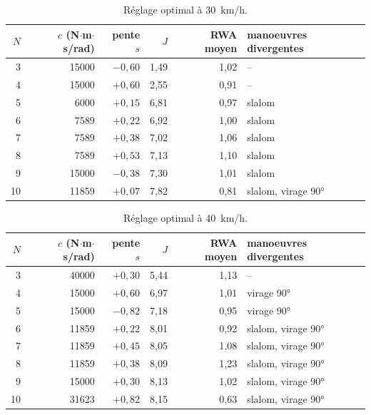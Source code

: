 \begin{table}[ht]\centering\small
\begin{tabular}{@{}r r r r r l@{}}\toprule
$N$ & $c$ (N$\cdot$m$\cdot$s/rad) & pente $s$ & $J$ & RWA moyen & manoeuvres divergentes\\\midrule
3 & 15000 & $-0{,}60$ & 1{,}49 & 1{,}02 & --\\
4 & 15000 & $+0{,}60$ & 2{,}55 & 0{,}91 & --\\
5 & 6000 & $+0{,}15$ & 6{,}81 & 0{,}97 & slalom\\
6 & 7589 & $+0{,}22$ & 6{,}92 & 1{,}00 & slalom\\
7 & 7589 & $+0{,}38$ & 7{,}02 & 1{,}06 & slalom\\
8 & 7589 & $+0{,}53$ & 7{,}13 & 1{,}10 & slalom\\
9 & 15000 & $-0{,}38$ & 7{,}30 & 1{,}01 & slalom\\
10 & 11859 & $+0{,}07$ & 7{,}82 & 0{,}81 & slalom, virage 90°\\
\bottomrule\end{tabular}
\caption{Réglage optimal à \SI{30}{km/h}.}\label{tab:opt30}\end{table}

\begin{table}[ht]\centering\small
\begin{tabular}{@{}r r r r r l@{}}\toprule
$N$ & $c$ (N$\cdot$m$\cdot$s/rad) & pente $s$ & $J$ & RWA moyen & manoeuvres divergentes\\\midrule
3 & 40000 & $+0{,}30$ & 5{,}44 & 1{,}13 & --\\
4 & 15000 & $+0{,}60$ & 6{,}97 & 1{,}01 & virage 90°\\
5 & 15000 & $-0{,}82$ & 7{,}18 & 0{,}95 & virage 90°\\
6 & 11859 & $+0{,}22$ & 8{,}01 & 0{,}92 & slalom, virage 90°\\
7 & 11859 & $+0{,}45$ & 8{,}05 & 1{,}08 & slalom, virage 90°\\
8 & 11859 & $+0{,}38$ & 8{,}09 & 1{,}23 & slalom, virage 90°\\
9 & 15000 & $+0{,}30$ & 8{,}13 & 1{,}02 & slalom, virage 90°\\
10 & 31623 & $+0{,}82$ & 8{,}15 & 0{,}63 & slalom, virage 90°\\
\bottomrule\end{tabular}
\caption{Réglage optimal à \SI{40}{km/h}.}\label{tab:opt40}\end{table}
